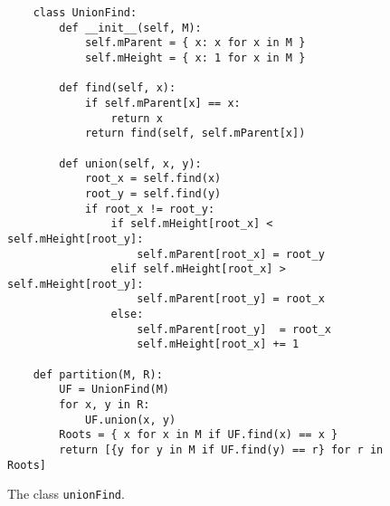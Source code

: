 \begin{figure}[!ht]
\centering
\begin{verbatim}
    class UnionFind:
        def __init__(self, M):
            self.mParent = { x: x for x in M }
            self.mHeight = { x: 1 for x in M }
            
        def find(self, x):
            if self.mParent[x] == x:
                return x
            return find(self, self.mParent[x])
        
        def union(self, x, y):
            root_x = self.find(x)
            root_y = self.find(y)
            if root_x != root_y:
                if self.mHeight[root_x] < self.mHeight[root_y]:
                    self.mParent[root_x] = root_y
                elif self.mHeight[root_x] > self.mHeight[root_y]:
                    self.mParent[root_y] = root_x
                else:
                    self.mParent[root_y]  = root_x
                    self.mHeight[root_x] += 1
                    
    def partition(M, R):
        UF = UnionFind(M)
        for x, y in R:
            UF.union(x, y)
        Roots = { x for x in M if UF.find(x) == x }
        return [{y for y in M if UF.find(y) == r} for r in Roots]
\end{verbatim}
\vspace*{-0.3cm}
\caption{The class \texttt{unionFind}.}
\label{fig:Union-Find-OO.ipynb}
\end{figure}

